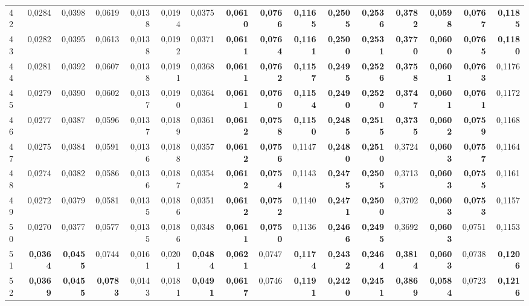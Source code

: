 \begin{table}[htp!]
\begin{adjustwidth}{-2cm}{}
\begin{tabular}{ l | *{15}{| r}}
42	&	0,0284	&	0,0398	&	0,0619	&	0,0138	&	0,0194	&	0,0375	&	\textbf{0,0610}	&	\textbf{0,0766}	&	\textbf{0,1165}	&	\textbf{0,2505}	&	\textbf{0,2536}	&	\textbf{0,3782}	&	\textbf{0,0598}	&	\textbf{0,0767}	&	\textbf{0,1185}	\\
43	&	0,0282	&	0,0395	&	0,0613	&	0,0138	&	0,0192	&	0,0371	&	\textbf{0,0611}	&	\textbf{0,0764}	&	\textbf{0,1161}	&	\textbf{0,2500}	&	\textbf{0,2531}	&	\textbf{0,3770}	&	\textbf{0,0600}	&	\textbf{0,0765}	&	\textbf{0,1180}	\\
44	&	0,0281	&	0,0392	&	0,0607	&	0,0138	&	0,0191	&	0,0368	&	\textbf{0,0611}	&	\textbf{0,0762}	&	\textbf{0,1157}	&	\textbf{0,2495}	&	\textbf{0,2526}	&	\textbf{0,3758}	&	\textbf{0,0601}	&	\textbf{0,0763}	&	0,1176	\\
45	&	0,0279	&	0,0390	&	0,0602	&	0,0137	&	0,0190	&	0,0364	&	\textbf{0,0611}	&	\textbf{0,0760}	&	\textbf{0,1154}	&	\textbf{0,2490}	&	\textbf{0,2520}	&	\textbf{0,3747}	&	\textbf{0,0601}	&	\textbf{0,0761}	&	0,1172	\\
46	&	0,0277	&	0,0387	&	0,0596	&	0,0137	&	0,0189	&	0,0361	&	\textbf{0,0612}	&	\textbf{0,0758}	&	\textbf{0,1150}	&	\textbf{0,2485}	&	\textbf{0,2515}	&	\textbf{0,3735}	&	\textbf{0,0602}	&	\textbf{0,0759}	&	0,1168	\\
47	&	0,0275	&	0,0384	&	0,0591	&	0,0136	&	0,0188	&	0,0357	&	\textbf{0,0612}	&	\textbf{0,0756}	&	0,1147	&	\textbf{0,2480}	&	\textbf{0,2510}	&	0,3724	&	\textbf{0,0603}	&	\textbf{0,0757}	&	0,1164	\\
48	&	0,0274	&	0,0382	&	0,0586	&	0,0136	&	0,0187	&	0,0354	&	\textbf{0,0612}	&	\textbf{0,0754}	&	0,1143	&	\textbf{0,2475}	&	\textbf{0,2505}	&	0,3713	&	\textbf{0,0603}	&	\textbf{0,0755}	&	0,1161	\\
49	&	0,0272	&	0,0379	&	0,0581	&	0,0135	&	0,0186	&	0,0351	&	\textbf{0,0612}	&	\textbf{0,0752}	&	0,1140	&	\textbf{0,2471}	&	\textbf{0,2500}	&	0,3702	&	\textbf{0,0603}	&	\textbf{0,0753}	&	0,1157	\\
50	&	0,0270	&	0,0377	&	0,0577	&	0,0135	&	0,0186	&	0,0348	&	\textbf{0,0611}	&	\textbf{0,0750}	&	0,1136	&	\textbf{0,2466}	&	\textbf{0,2495}	&	0,3692	&	\textbf{0,0603}	&	0,0751	&	0,1153	\\
51	&	\textbf{0,0364}	&	\textbf{0,0455}	&	0,0744	&	0,0161	&	0,0201	&	\textbf{0,0484}	&	\textbf{0,0621}	&	0,0747	&	\textbf{0,1174}	&	\textbf{0,2432}	&	\textbf{0,2464}	&	\textbf{0,3814}	&	\textbf{0,0603}	&	0,0738	&	\textbf{0,1206}	\\
52	&	\textbf{0,0369}	&	\textbf{0,0455}	&	\textbf{0,0783}	&	0,0143	&	0,0181	&	\textbf{0,0491}	&	\textbf{0,0617}	&	0,0746	&	\textbf{0,1191}	&	\textbf{0,2420}	&	\textbf{0,2451}	&	\textbf{0,3869}	&	\textbf{0,0584}	&	0,0723	&	\textbf{0,1216}	\\

\end{tabular}
\end{adjustwidth}
\end{table}
